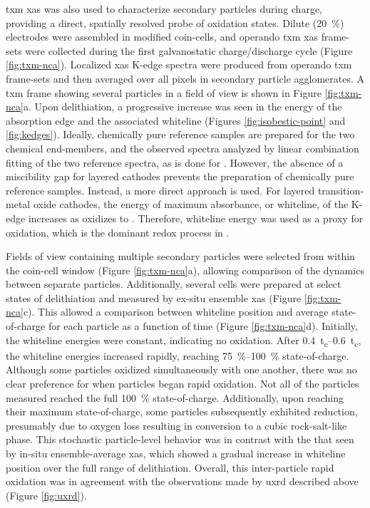 \documentclass{article}
\begin{document}
\Gls{txm} \gls{xas} was also used to characterize \nca{} secondary
particles during charge, providing a direct, spatially resolved probe
of  oxidation states. Dilute (\SI{20}{\percent}) \nca{}
electrodes were assembled in modified coin-cells, and operando
\gls{txm} \gls{xas} frame-sets were collected during the first
galvanostatic charge/discharge cycle (Figure
\ref{fig:txm-nca}). Localized \gls{xas} K-edge spectra were produced
from operando \gls{txm} frame-sets and then averaged over all pixels
in secondary particle agglomerates. A \gls{txm} frame showing several
particles in a field of view is shown in Figure \ref{fig:txm-nca}a. Upon
delithiation, a progressive increase was seen in the energy of the
absorption edge and the associated whiteline (Figures
\ref{fig:isobestic-point} and \ref{fig:kedges}). Ideally, chemically
pure reference samples are prepared for the two chemical end-members,
and the observed spectra analyzed by linear combination fitting of the
two reference spectra, as is done for
\cite{wanli2016}. However, the absence of a miscibility
gap for layered cathodes prevents the preparation of chemically pure
reference samples. Instead, a more direct approach is used. For
layered transition-metal oxide cathodes, the energy of maximum
absorbance, or whiteline, of the  K-edge increases as
 oxidizes to . Therefore, whiteline energy was
used as a proxy for  oxidation, which is the dominant redox
process in \nca{}.

Fields of view containing multiple secondary particles were selected
from within the coin-cell window (Figure \ref{fig:txm-nca}a), allowing
comparison of the dynamics between separate particles. Additionally,
several cells were prepared at select states of delithiation and
measured by ex-situ ensemble \gls{xas} (Figure
\ref{fig:txm-nca}c). This allowed a comparison between whiteline
position and average state-of-charge for each particle as a function
of time (Figure \ref{fig:txm-nca}d). Initially, the whiteline energies
were constant, indicating no  oxidation. After
\SIrange{0.4}{0.6}{t_c}, the whiteline energies increased rapidly,
reaching \SIrange{75}{100}{\percent} state-of-charge. Although some
particles oxidized simultaneously with one another, there was no clear
preference for when particles began rapid oxidation. Not all of the
particles measured reached the full \SI{100}{\percent}
state-of-charge. Additionally, upon reaching their maximum
state-of-charge, some particles subsequently exhibited 
reduction, presumably due to oxygen loss resulting in conversion to a
cubic rock-salt-like phase\citeme{}. This stochastic particle-level
behavior was in contrast with the that seen by in-situ
ensemble-average \gls{xas}\cite{deb2005}, which showed a gradual
increase in whiteline position over the full range of
delithiation. Overall, this inter-particle rapid oxidation was in
agreement with the observations made by \gls{uxrd} described above
(Figure \ref{fig:uxrd}).
\end{document}
